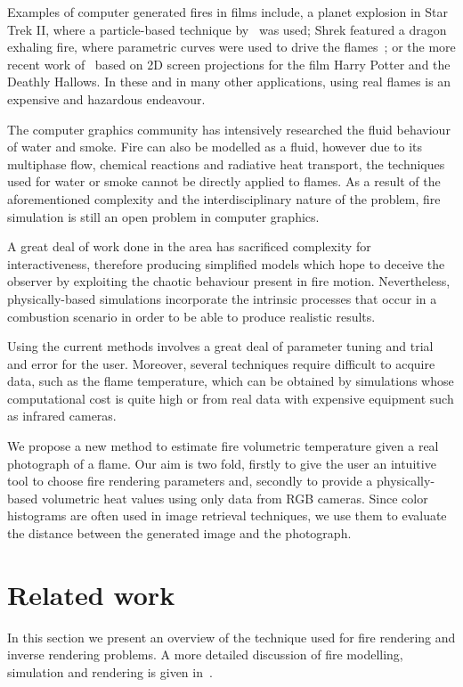 \documentclass{acmsiggraph}
\begin{document}
Examples of computer generated fires in films include, a planet explosion in Star Trek II, where a particle-based technique by~\cite{Reeves:1983} was used; Shrek featured a dragon exhaling fire, where parametric curves were used to drive the flames~\cite{Lamorlette:2002}; or the more recent work of~\cite{Horvath:2009} based on 2D screen projections for the film Harry Potter and the Deathly Hallows.
In these and in many other applications, using real flames is an expensive and hazardous endeavour.

The computer graphics community has intensively researched the fluid behaviour of water and smoke.
Fire can also be modelled as a fluid, however due to its multiphase flow, chemical reactions and radiative heat transport, the techniques used for water or smoke cannot be directly applied to flames.
As a result of the aforementioned complexity and the interdisciplinary nature of the problem, fire simulation is still an open problem in computer graphics.

A great deal of work done in the area has sacrificed complexity for interactiveness, therefore producing simplified models which hope to deceive the observer by exploiting the chaotic behaviour present in fire motion.
Nevertheless, physically-based simulations incorporate the intrinsic processes that occur in a combustion scenario in order to be able to produce realistic results.

Using the current methods involves a great deal of parameter tuning and trial and error for the user.
Moreover, several techniques require difficult to acquire data, such as the flame temperature, which can be obtained by simulations whose computational cost is quite high or from real data with expensive equipment such as infrared cameras.

We propose a new method to estimate fire volumetric temperature given a real photograph of a flame.
Our aim is two fold, firstly to give the user an intuitive tool to choose fire rendering parameters and, secondly to provide a physically-based volumetric heat values using only data from RGB cameras.
Since color histograms are often used in image retrieval techniques, we use them to evaluate the distance between the generated image and the photograph.


\section{Related work}

In this section we present an overview of the technique used for fire rendering and inverse rendering problems.
A more detailed discussion of fire modelling, simulation and rendering is given in~\cite{Huang:2014}.
\end{document}
